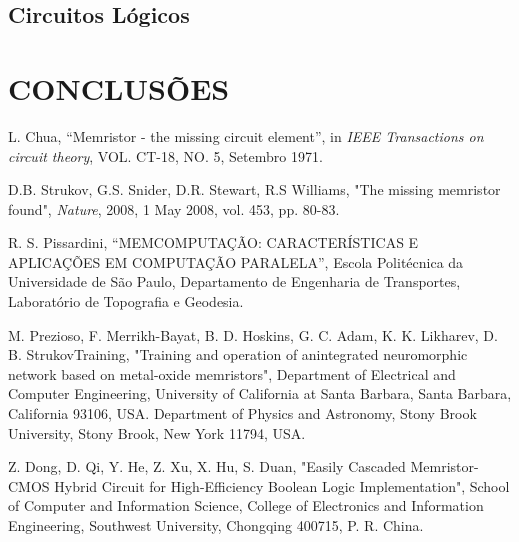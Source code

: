\documentclass{ceel}
\begin{document}
\begin{multicols}{2}
\subsection{Circuitos Lógicos} %


\section{CONCLUSÕES}


\begin{thebibliography}{9}

    L. Chua,
    “Memristor - the missing circuit element”, 
    in \emph{IEEE Transactions on circuit theory}, VOL. CT-18, NO. 5, Setembro 1971.

     D.B. Strukov, G.S. Snider, D.R. Stewart,  R.S Williams, 
"The missing memristor found", 
\emph{Nature}, 2008, 1 May 2008, vol. 453, pp. 80-83.

    R. S. Pissardini,
    “MEMCOMPUTAÇÃO: CARACTERÍSTICAS E APLICAÇÕES EM
COMPUTAÇÃO PARALELA”, Escola Politécnica da Universidade de São Paulo, Departamento de Engenharia de Transportes, Laboratório de Topografia e Geodesia.
 
   M. Prezioso, F. Merrikh-Bayat, B. D. Hoskins, G. C. Adam, K. K. Likharev, D. B. StrukovTraining, "Training and operation of anintegrated neuromorphic
network based on metal-oxide memristors", 
Department of Electrical and Computer Engineering, University of California at Santa Barbara, Santa Barbara, California 93106, USA. 
Department of Physics and Astronomy, Stony Brook University,
Stony Brook, New York 11794, USA. 

    Z. Dong, D. Qi, Y. He, Z. Xu, X. Hu, S. Duan, "Easily Cascaded Memristor-CMOS Hybrid Circuit
for High-Efficiency Boolean Logic Implementation", School of Computer and Information Science,
College of Electronics and Information Engineering,
Southwest University, Chongqing 400715, P. R. China.


\end{thebibliography}
\end{multicols}
\end{document}
